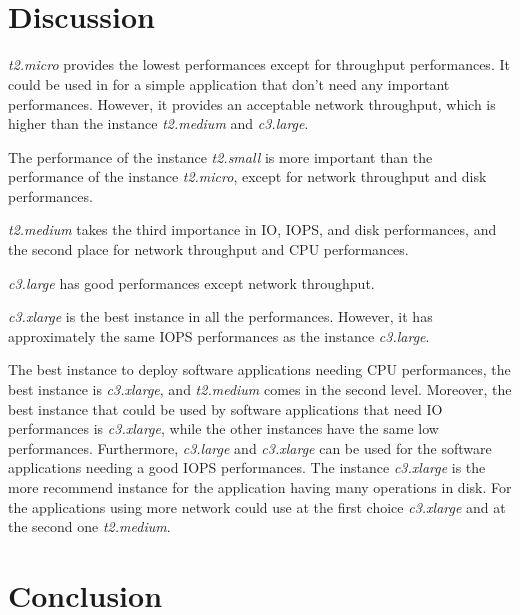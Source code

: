 \documentclass[10pt, conference]{IEEEtran}
\begin{document}
\

\
\nocite{*}

\section{Discussion}
\label{sec:discussion}

\textit{t2.micro} provides the lowest performances except for throughput performances. It could be used in for a simple application that don't need any important performances. However, it provides an acceptable network throughput, which is higher than the instance \textit{t2.medium} and \textit{c3.large}.

The performance of the instance \textit{t2.small} is more important than the performance of the instance \textit{t2.micro}, except for network throughput and disk performances. 

\textit{t2.medium} takes the third importance in IO, IOPS, and disk performances, and the second place for network throughput and CPU performances.

\textit{c3.large} has good performances except network throughput. 

\textit{c3.xlarge} is the best instance in all the performances. However, it has approximately the same IOPS performances as the instance \textit{c3.large}.

The best instance to deploy software applications needing CPU performances, the best instance is \textit{c3.xlarge}, and \textit{t2.medium} comes in the second level. Moreover, the best instance that could be used by software applications that need IO performances is \textit{c3.xlarge}, while the other instances have the same low performances. Furthermore, \textit{c3.large} and \textit{c3.xlarge} can be used for the software applications needing a good IOPS performances. The instance \textit{c3.xlarge} is the more recommend instance for the application having many operations in disk. For the applications using more network could use at the first choice \textit{c3.xlarge} and at the second one \textit{t2.medium}.


\section{Conclusion}
\label{sec:conclusion}


\balance


\end{document}
